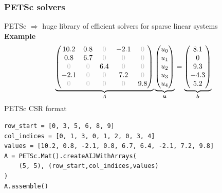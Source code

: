 \documentclass{beamer}
\begin{document}

\begin{frame}[fragile]
  \frametitle{PETSc solvers}
  PETSc $\Rightarrow$ huge library of efficient solvers for sparse linear systems\\[1ex]
\textbf{Example}
$$
\underbrace{\begin{pmatrix}
10.2 & 0.8 & \textcolor{lightgray}{0}  &  -2.1 &  \textcolor{lightgray}{0}\\
0.8 & 6.7 & \textcolor{lightgray}{0} &  \textcolor{lightgray}{0} &  \textcolor{lightgray}{0} \\
\textcolor{lightgray}{0} & \textcolor{lightgray}{0} & 6.4 & \textcolor{lightgray}{0} & \textcolor{lightgray}{0} \\
-2.1 & \textcolor{lightgray}{0} & \textcolor{lightgray}{0} & 7.2 & \textcolor{lightgray}{0} \\
\textcolor{lightgray}{0} & \textcolor{lightgray}{0} & \textcolor{lightgray}{0} & \textcolor{lightgray}{0} & 9.8
 \end{pmatrix}}_{A}
 \underbrace{\begin{pmatrix}
  u_0\\u_1\\u_2\\u_3\\u_4
 \end{pmatrix}}_{\boldsymbol{u}}
 =
 \underbrace{\begin{pmatrix}
  8.1\\0\\9.3\\-4.3\\5.2
  \end{pmatrix}
  }_{\boldsymbol{b}}
$$
PETSc CSR format
\begin{lstlisting}
row_start = [0, 3, 5, 6, 8, 9]
col_indices = [0, 1, 3, 0, 1, 2, 0, 3, 4]
values = [10.2, 0.8, -2.1, 0.8, 6.7, 6.4, -2.1, 7.2, 9.8]
A = PETSc.Mat().createAIJWithArrays(
    (5, 5), (row_start,col_indices,values)
)
A.assemble()
\end{lstlisting}
\end{frame}

\end{document}
